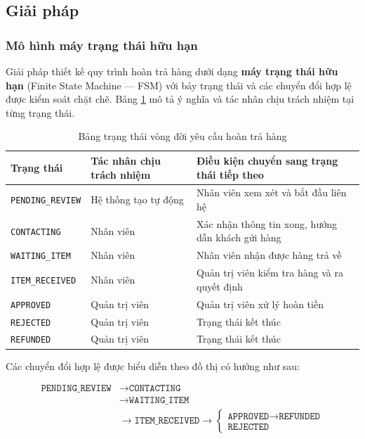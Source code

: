 \documentclass[../DoAn.tex]{subfiles}
\begin{document}
\subsection{Giải pháp}

\subsubsection*{Mô hình máy trạng thái hữu hạn}
Giải pháp thiết kế quy trình hoàn trả hàng dưới dạng \textbf{máy trạng thái
hữu hạn} (Finite State Machine --- FSM) với bảy trạng thái và các chuyển đổi
hợp lệ được kiểm soát chặt chẽ. Bảng \ref{tab:return-states} mô tả ý nghĩa
và tác nhân chịu trách nhiệm tại từng trạng thái.

\begin{table}[H]
\centering
\caption{Bảng trạng thái vòng đời yêu cầu hoàn trả hàng}
\label{tab:return-states}
\begin{tabular}{|p{4cm}|p{4cm}|p{5cm}|}
\hline
\textbf{Trạng thái} & \textbf{Tác nhân chịu trách nhiệm} & \textbf{Điều kiện chuyển sang trạng thái tiếp theo} \\
\hline
\texttt{PENDING\_REVIEW} & Hệ thống tạo tự động & Nhân viên xem xét và bắt đầu liên hệ \\
\hline
\texttt{CONTACTING} & Nhân viên & Xác nhận thông tin xong, hướng dẫn khách gửi hàng \\
\hline
\texttt{WAITING\_ITEM} & Nhân viên & Nhân viên nhận được hàng trả về \\
\hline
\texttt{ITEM\_RECEIVED} & Nhân viên & Quản trị viên kiểm tra hàng và ra quyết định \\
\hline
\texttt{APPROVED} & Quản trị viên & Quản trị viên xử lý hoàn tiền \\
\hline
\texttt{REJECTED} & Quản trị viên & Trạng thái kết thúc \\
\hline
\texttt{REFUNDED} & Quản trị viên & Trạng thái kết thúc \\
\hline
\end{tabular}
\end{table}

Các chuyển đổi hợp lệ được biểu diễn theo đồ thị có hướng như sau:

\[
\begin{aligned}
\texttt{PENDING\_REVIEW} 
&\to \texttt{CONTACTING} \\
&\to \texttt{WAITING\_ITEM} \\
&\to \texttt{ITEM\_RECEIVED} \to
\begin{cases}
\texttt{APPROVED} \to \texttt{REFUNDED} \\
\texttt{REJECTED}
\end{cases}
\end{aligned}
\]
\end{document}
